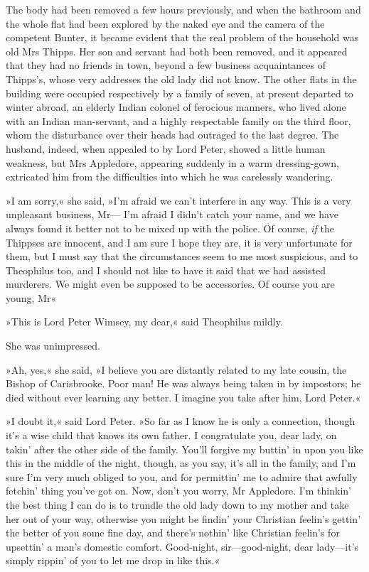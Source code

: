 The body had been removed a few hours previously, and when the bathroom and the whole flat had been explored by the naked eye and the camera of the competent Bunter, it became evident that the real problem of the household was old Mrs Thipps. Her son and servant had both been removed, and it appeared that they had no friends in town, beyond a few business acquaintances of Thipps's, whose very addresses the old lady did not know. The other flats in the building were occupied respectively by a family of seven, at present departed to winter abroad, an elderly Indian colonel of ferocious manners, who lived alone with an Indian man-servant, and a highly respectable family on the third floor, whom the disturbance over their heads had outraged to the last degree. The husband, indeed, when appealed to by Lord Peter, showed a little human weakness, but Mrs Appledore, appearing suddenly in a warm dressing-gown, extricated him from the difficulties into which he was carelessly wandering.

»I am sorry,« she said, »I'm afraid we can't interfere in any way. This is a very unpleasant business, Mr— I'm afraid I didn't catch your name, and we have always found it better not to be mixed up with the police. Of course, \textit{if} the Thippses are innocent, and I am sure I hope they are, it is very unfortunate for them, but I must say that the circumstances seem to me most suspicious, and to Theophilus too, and I should not like to have it said that we had assisted murderers. We might even be supposed to be accessories. Of course you are young, Mr\longdash«

»This is Lord Peter Wimsey, my dear,« said Theophilus mildly.

She was unimpressed.

»Ah, yes,« she said, »I believe you are distantly related to my late cousin, the Bishop of Carisbrooke. Poor man! He was always being taken in by impostors; he died without ever learning any better. I imagine you take after him, Lord Peter.«

»I doubt it,« said Lord Peter. »So far as I know he is only a connection, though it's a wise child that knows its own father. I congratulate you, dear lady, on takin' after the other side of the family. You'll forgive my buttin' in upon you like this in the middle of the night, though, as you say, it's all in the family, and I'm sure I'm very much obliged to you, and for permittin' me to admire that awfully fetchin' thing you've got on. Now, don't you worry, Mr Appledore. I'm thinkin' the best thing I can do is to trundle the old lady down to my mother and take her out of your way, otherwise you might be findin' your Christian feelin's gettin' the better of you some fine day, and there's nothin' like Christian feelin's for upsettin' a man's domestic comfort. Good-night, sir—good-night, dear lady—it's simply rippin' of you to let me drop in like this.«

